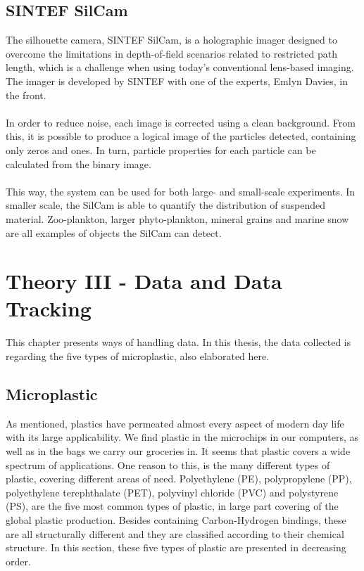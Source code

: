 \vspace{1.3cm}
\section{SINTEF SilCam}
The silhouette camera, SINTEF SilCam, is a holographic imager designed to overcome the limitations in depth-of-field scenarios related to restricted path length, which is a challenge when using today's conventional lens-based imaging. The imager is developed by SINTEF with one of the experts, Emlyn Davies, in the front.
\\\\
In order to reduce noise, each image is corrected using a clean background. From this, it is possible to produce a logical image of the particles detected, containing only zeros and ones. In turn, particle properties for each particle can be calculated from the binary image.
\\\\
This way, the system can be used for both large- and small-scale experiments. In smaller scale, the SilCam is able to quantify the distribution of suspended material. Zoo-plankton, larger phyto-plankton, mineral grains and marine snow are all examples of objects the SilCam can detect. 


\chapter{Theory III - Data and Data Tracking} \label{cap:theory3}
This chapter presents ways of handling data. In this thesis, the data collected is regarding the five types of microplastic, also elaborated here. 

\section{Microplastic} \label{sec:microplastic}
\noindent
As mentioned, plastics have permeated almost every aspect of modern day life with its large applicability. We find plastic in the microchips in our computers, as well as in the bags we carry our groceries in. It seems that plastic covers a wide spectrum of applications.  One reason to this, is the many different types of plastic, covering different areas of need. Polyethylene (PE), polypropylene (PP), polyethylene terephthalate (PET), polyvinyl chloride (PVC) and polystyrene (PS), are the five most common types of plastic, in large part covering of the global plastic production. Besides containing Carbon-Hydrogen bindings, these are all structurally different and they are classified according to their chemical structure. In this section, these five types of plastic are presented in decreasing order. 
\\\\

